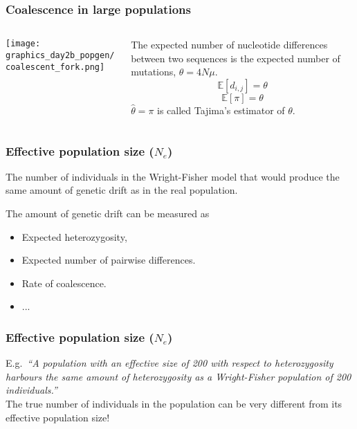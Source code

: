 \documentclass{beamer}
\newcommand{\E}{\mathbb{E}}
\newcommand{\1}{\ensuremath{\mathbf{1}}}
\begin{document}
%
%
%
\begin{frame}\frametitle{Coalescence in large populations}
	\begin{columns}
	\begin{column}{.33\textwidth}
		\begin{center}
			\texttt{[image: graphics\_day2b\_popgen/coalescent\_fork.png]}
		\end{center}
	\end{column}
	\begin{column}{.66\textwidth}
		The expected number of nucleotide differences between two sequences is the expected number of mutations, $\theta = 4N\mu$.
		\begin{equation}
			\E[d_{i,j}] = \theta
		\end{equation}
		\begin{equation}
			\E[\pi] = \theta
		\end{equation}
		$\hat\theta = \pi$ is called Tajima’s estimator of $\theta$.
	\end{column}
	\end{columns}
\end{frame}
%
%
%
\begin{frame}\frametitle{Effective population size ($N_e$)}
	\begin{block}{}
		The number of individuals in the Wright-Fisher model that would produce the same amount of genetic drift as in the real population.
	\end{block}
	The amount of genetic drift can be measured as
	\begin{itemize}
		\item Expected heterozygosity,
		\item Expected number of pairwise differences.
		\item Rate of coalescence.
		\item ...
	\end{itemize}
\end{frame}
%
%
%
\begin{frame}\frametitle{Effective population size ($N_e$)}
	E.g.\ \emph{``A population with an effective size of 200 with respect to heterozygosity harbours the same amount of heterozygosity as a Wright-Fisher population of 200 individuals.''}\\[2ex]
	The true number of individuals in the population can be very different from its effective population size!
\end{frame}
\end{document}
